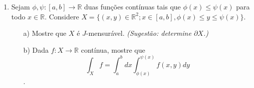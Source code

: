 \documentclass[11pt]{report}
\begin{document}
\begin{enumerate}
		\item Sejam $\phi, \psi : [a, b] \rightarrow \mathbb{R}$ duas funções contínuas tais que $\phi(x) \leq \psi(x)$ para todo $x \in \mathbb{R}$. Considere $X = \{(x, y) \in \mathbb{R}^{2}; x \in [a, b], \phi(x) \leq y \leq \psi(x) \}$.
		
		\begin{enumerate}
			\item[a)] Mostre que $X$ é $J$-mensurável. \textit{(Sugestão: determine $\partial X$.)}
			
			\item[b)] Dada $f : X \rightarrow\mathbb{R}$ contínua, mostre que \\
			$$\int_X f = \int_{a}^{b} dx \int_{\phi(x)}^{\psi(x)} f(x, y)dy$$.
		\end{enumerate}
	\end{enumerate}
\end{document}
